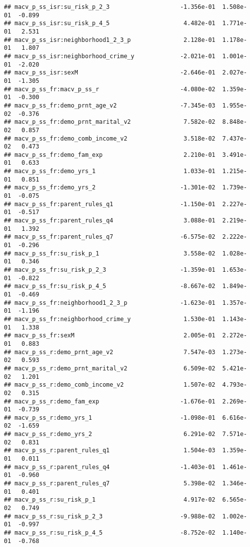 \documentclass[
]{article}
\begin{document}
\begin{verbatim}
## macv_p_ss_isr:su_risk_p_2_3                    -1.356e-01  1.508e-01  -0.899
## macv_p_ss_isr:su_risk_p_4_5                     4.482e-01  1.771e-01   2.531
## macv_p_ss_isr:neighborhood1_2_3_p               2.128e-01  1.178e-01   1.807
## macv_p_ss_isr:neighborhood_crime_y             -2.021e-01  1.001e-01  -2.020
## macv_p_ss_isr:sexM                             -2.646e-01  2.027e-01  -1.305
## macv_p_ss_fr:macv_p_ss_r                       -4.080e-02  1.359e-01  -0.300
## macv_p_ss_fr:demo_prnt_age_v2                  -7.345e-03  1.955e-02  -0.376
## macv_p_ss_fr:demo_prnt_marital_v2               7.582e-02  8.848e-02   0.857
## macv_p_ss_fr:demo_comb_income_v2                3.518e-02  7.437e-02   0.473
## macv_p_ss_fr:demo_fam_exp                       2.210e-01  3.491e-01   0.633
## macv_p_ss_fr:demo_yrs_1                         1.033e-01  1.215e-01   0.851
## macv_p_ss_fr:demo_yrs_2                        -1.301e-02  1.739e-01  -0.075
## macv_p_ss_fr:parent_rules_q1                   -1.150e-01  2.227e-01  -0.517
## macv_p_ss_fr:parent_rules_q4                    3.088e-01  2.219e-01   1.392
## macv_p_ss_fr:parent_rules_q7                   -6.575e-02  2.222e-01  -0.296
## macv_p_ss_fr:su_risk_p_1                        3.558e-02  1.028e-01   0.346
## macv_p_ss_fr:su_risk_p_2_3                     -1.359e-01  1.653e-01  -0.822
## macv_p_ss_fr:su_risk_p_4_5                     -8.667e-02  1.849e-01  -0.469
## macv_p_ss_fr:neighborhood1_2_3_p               -1.623e-01  1.357e-01  -1.196
## macv_p_ss_fr:neighborhood_crime_y               1.530e-01  1.143e-01   1.338
## macv_p_ss_fr:sexM                               2.005e-01  2.272e-01   0.883
## macv_p_ss_r:demo_prnt_age_v2                    7.547e-03  1.273e-02   0.593
## macv_p_ss_r:demo_prnt_marital_v2                6.509e-02  5.421e-02   1.201
## macv_p_ss_r:demo_comb_income_v2                 1.507e-02  4.793e-02   0.315
## macv_p_ss_r:demo_fam_exp                       -1.676e-01  2.269e-01  -0.739
## macv_p_ss_r:demo_yrs_1                         -1.098e-01  6.616e-02  -1.659
## macv_p_ss_r:demo_yrs_2                          6.291e-02  7.571e-02   0.831
## macv_p_ss_r:parent_rules_q1                     1.504e-03  1.359e-01   0.011
## macv_p_ss_r:parent_rules_q4                    -1.403e-01  1.461e-01  -0.960
## macv_p_ss_r:parent_rules_q7                     5.398e-02  1.346e-01   0.401
## macv_p_ss_r:su_risk_p_1                         4.917e-02  6.565e-02   0.749
## macv_p_ss_r:su_risk_p_2_3                      -9.988e-02  1.002e-01  -0.997
## macv_p_ss_r:su_risk_p_4_5                      -8.752e-02  1.140e-01  -0.768

\end{verbatim}
\end{document}
